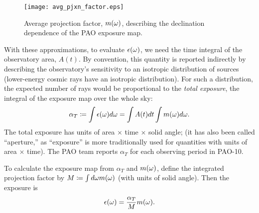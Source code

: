 \begin{figure}
\centerline{\texttt{[image: avg\_pjxn\_factor.eps]}}
\caption{Average projection factor, $m(\omega)$, describing the declination
dependence of the PAO exposure map.}
\label{fig:pjxn}
\end{figure}

With these approximations, to evaluate $\epsilon(\omega)$, we need the
time integral of the observatory area, $A(t)$.  By convention, this
quantity is reported indirectly by describing the observatory's
sensitivity to an isotropic distribution of sources (lower-energy cosmic
rays have an isotropic distribution).  For such a distribution, the expected
number of rays would be proportional to the {\em total exposure}, the
integral of the exposure map over the whole sky:
\begin{equation}
\alpha_T \coloneqq \int \expo(\tdrxn) d\tdrxn = \int A(t) dt \int m(\tdrxn) d\tdrxn.
\label{ET-def}
\end{equation}
The total exposure has units of area $\times$ time $\times$ solid angle;
(it has also been called ``aperture,'' as ``exposure'' is more traditionally
used for quantities with units of area $\times$ time).  The PAO team
reports $\alpha_T$ for each observing period in PAO-10.

To calculate the exposure map from $\alpha_T$ and $m(\omega)$, define the
integrated projection factor by $M \coloneqq \int d\omega m(\omega)$ (with
units of solid angle).  Then the exposure is
\begin{equation}
\expo(\tdrxn) = \frac{\alpha_T}{M} m(\tdrxn).
\label{expo-mET}
\end{equation}

